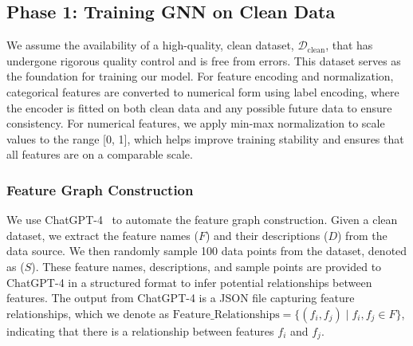 \subsection{Phase 1: Training GNN on Clean Data}
We assume the availability of a high-quality, clean dataset, $\mathcal{D}_{\text{clean}}$, that has undergone rigorous quality control and is free from errors. This dataset serves as the foundation for training our model. 
For feature encoding and normalization, categorical features are converted to numerical form using label encoding, where the encoder is fitted on both clean data and any possible future data to ensure consistency. 
For numerical features, we apply min-max normalization to scale values to the range [0, 1], which helps improve training stability and ensures that all features are on a comparable scale.


\subsubsection{\textbf{Feature Graph Construction}}

We use ChatGPT-4~\cite{openai2024gpt4} to automate the feature graph construction. 
Given a clean dataset, we extract the feature names ($F$) and their descriptions ($D$) from the data source. We then randomly sample 100 data points from the dataset, denoted as ($S$). 
These feature names, descriptions, and sample points are provided to ChatGPT-4 in a structured format to infer potential relationships between features. 
The output from ChatGPT-4 is a JSON file capturing feature relationships, which we denote as  \(\text{Feature\_Relationships} = \{ (f_i, f_j) \mid f_i, f_j \in F \}\), indicating that there is a relationship between features \( f_i \) and \( f_j \).


